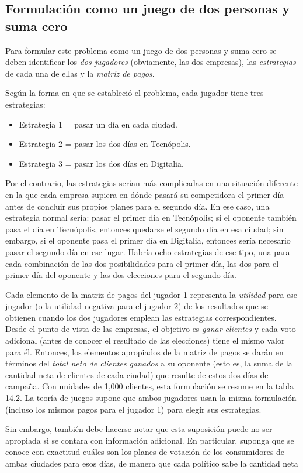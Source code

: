 \documentclass[12pt]{article}
\begin{document}
\subsection*{Formulación como un juego de dos personas y suma cero}

Para formular este problema como un juego de dos personas y suma cero se deben identificar los \textit{dos jugadores} (obviamente, las dos empresas), las \textit{estrategias} de cada una de ellas y la \textit{matriz de pagos}.

Según la forma en que se estableció el problema, cada jugador tiene tres estrategias:

\begin{itemize}
    \item Estrategia 1 = pasar un día en cada ciudad.
    \item Estrategia 2 = pasar los dos días en Tecnópolis.
    \item Estrategia 3 = pasar los dos días en Digitalia.
\end{itemize}

Por el contrario, las estrategias serían más complicadas en una situación diferente en la que cada empresa supiera en dónde pasará su competidora el primer día antes de concluir sus propios planes para el segundo día. En ese caso, una estrategia normal sería: pasar el primer día en Tecnópolis; si el oponente también pasa el día en Tecnópolis, entonces quedarse el segundo día en esa ciudad; sin embargo, si el oponente pasa el primer día en Digitalia, entonces sería necesario pasar el segundo día en ese lugar. Habría ocho estrategias de ese tipo, una para cada combinación de las dos posibilidades para el primer día, las dos para el primer día del oponente y las dos elecciones para el segundo día.

Cada elemento de la matriz de pagos del jugador 1 representa la \textit{utilidad} para ese jugador (o la utilidad negativa para el jugador 2) de los resultados que se obtienen cuando los dos jugadores emplean las estrategias correspondientes. Desde el punto de vista de las empresas, el objetivo es \textit{ganar clientes} y cada voto adicional (antes de conocer el resultado de las elecciones) tiene el mismo valor para él. Entonces, los elementos apropiados de la matriz de pagos se darán en términos del \textit{total neto de clientes ganados} a su oponente (esto es, la suma de la cantidad neta de clientes de cada ciudad) que resulte de estos dos días de campaña. Con unidades de 1,000 clientes, esta formulación se resume en la tabla 14.2. La teoría de juegos supone que ambos jugadores usan la misma formulación (incluso los mismos pagos para el jugador 1) para elegir sus estrategias.

Sin embargo, también debe hacerse notar que esta suposición puede no ser apropiada si se contara con información adicional. En particular, suponga que se conoce con exactitud cuáles son los planes de votación de los consumidores de ambas ciudades para esos días, de manera que cada político sabe la cantidad neta
\end{document}
